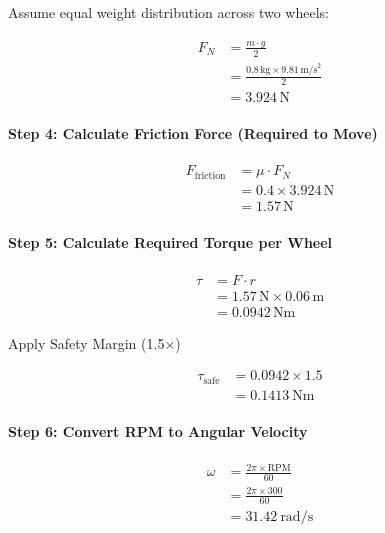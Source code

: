 \documentclass[12pt,a4paper,english]{article}
\begin{document}
Assume equal weight distribution across two wheels:

\begin{align*}
    F_N &= \frac{m \cdot g}{2} \\
        &= \frac{0.8\,\text{kg} \times 9.81\,\text{m/s}^2}{2} \\
        &= 3.924\,\text{N}
\end{align*}

\paragraph{Step 4: Calculate Friction Force (Required to Move)}

\begin{align*}
    F_{\text{friction}} &= \mu \cdot F_N \\
                        &= 0.4 \times 3.924\,\text{N} \\
                        &= 1.57\,\text{N}
\end{align*}

\paragraph{Step 5: Calculate Required Torque per Wheel}

\begin{align*}
    \tau &= F \cdot r \\
         &= 1.57\,\text{N} \times 0.06\,\text{m} \\
         &= 0.0942\,\text{Nm}
\end{align*}

Apply Safety Margin (1.5×)

\begin{align*}
    \tau_{\text{safe}} &= 0.0942 \times 1.5 \\
                       &= \SI{0.1413}{\newton\meter}
\end{align*}

\paragraph{Step 6: Convert RPM to Angular Velocity}

\begin{align*}
    \omega &= \frac{2\pi \times \text{RPM}}{60} \\
           &= \frac{2\pi \times 300}{60} \\
           &= \SI{31.42}{\radian\per\second}
\end{align*}
\end{document}

